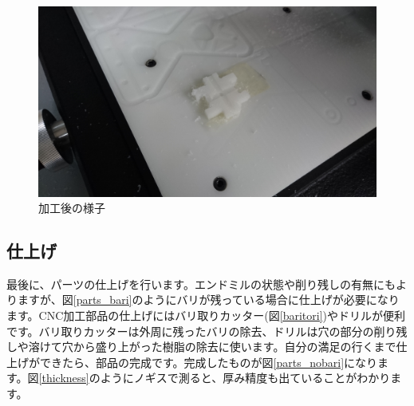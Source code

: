 \documentclass[b5paper, 9pt, twocolumn, titlepage,openany]{jsbook}%
\begin{document}
\begin{figure}[tbh]
  \begin{center}
    \begin{minipage}{0.5\columnwidth}
      \includegraphics[width=\columnwidth]{after_milling.jpg}
    \end{minipage}
    \caption{加工後の様子\label{after_milling}}
  \end{center}
\end{figure}


\clearpage
\subsection{仕上げ}
最後に、パーツの仕上げを行います。エンドミルの状態や削り残しの有無にもよりますが、図\ref{parts_bari}のようにバリが残っている場合に仕上げが必要になります。CNC加工部品の仕上げにはバリ取りカッター(図\ref{baritori})やドリルが便利です。バリ取りカッターは外周に残ったバリの除去、ドリルは穴の部分の削り残しや溶けて穴から盛り上がった樹脂の除去に使います。自分の満足の行くまで仕上げができたら、部品の完成です。完成したものが図\ref{parts_nobari}になります。図\ref{thickness}のようにノギスで測ると、厚み精度も出ていることがわかります。\\
\end{document}
